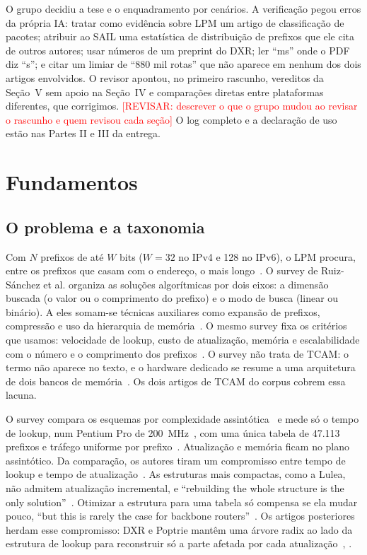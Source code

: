 \documentclass[conference,a4paper]{IEEEtran}
\newcommand{\revisar}[1]{\textcolor{red}{[REVISAR: #1]}}
\begin{document}
O grupo decidiu a tese e o enquadramento por cenários. A verificação pegou erros da própria IA: tratar como evidência
sobre LPM um artigo de classificação de pacotes; atribuir ao SAIL uma estatística de distribuição de prefixos que ele
cita de outros autores; usar números de um preprint do DXR; ler ``ms'' onde o PDF diz ``\textmu s''; e citar um limiar
de ``880 mil rotas'' que não aparece em nenhum dos dois artigos envolvidos. O revisor apontou, no primeiro rascunho,
vereditos da Seção~V sem apoio na Seção~IV e comparações diretas entre plataformas diferentes, que corrigimos.
\revisar{descrever o que o grupo mudou ao revisar o rascunho e quem revisou cada seção} O log completo e a declaração de
uso estão nas Partes II e III da entrega.

\section{Fundamentos}

\subsection{O problema e a taxonomia}
Com $N$ prefixos de até $W$ bits ($W=32$ no IPv4 e 128 no IPv6), o LPM procura, entre os prefixos que casam com o
endereço, o mais longo~\cite[p.~10]{ruiz01}. O survey de Ruiz-Sánchez et al. organiza as soluções algorítmicas por dois
eixos: a dimensão buscada (o valor ou o comprimento do prefixo) e o modo de busca (linear ou binário). A eles somam-se
técnicas auxiliares como expansão de prefixos, compressão e uso da hierarquia de memória~\cite[pp.~13--14]{ruiz01}. O
mesmo survey fixa os critérios que usamos: velocidade de lookup, custo de atualização, memória e escalabilidade com o
número e o comprimento dos prefixos~\cite[p.~20]{ruiz01}. O survey não trata de TCAM: o termo não aparece no texto, e o
hardware dedicado se resume a uma arquitetura de dois bancos de memória~\cite[p.~16]{ruiz01}. Os dois artigos de TCAM
do corpus cobrem essa lacuna.

O survey compara os esquemas por complexidade assintótica~\cite[Tab.~2]{ruiz01} e mede só o tempo de lookup, num
Pentium Pro de 200~MHz~\cite[p.~21]{ruiz01}, com uma única tabela de 47.113 prefixos e tráfego uniforme por prefixo~\cite[Tab.~3,
p.~22]{ruiz01}. Atualização e memória ficam no plano assintótico. Da comparação, os autores tiram um compromisso entre
tempo de lookup e tempo de atualização~\cite[p.~22]{ruiz01}. As estruturas mais compactas, como a Lulea, não admitem
atualização incremental, e ``rebuilding the whole structure is the only solution''~\cite[p.~18]{ruiz01}. Otimizar a
estrutura para uma tabela só compensa se ela mudar pouco, ``but this is rarely the case for backbone
routers''~\cite[p.~17]{ruiz01}. Os artigos posteriores herdam esse compromisso: DXR e Poptrie mantêm uma árvore radix
ao lado da estrutura de lookup para reconstruir só a parte afetada por cada atualização~\cite[\S3.4]{zec12},
\cite[\S3.5]{asai15}.
\end{document}
